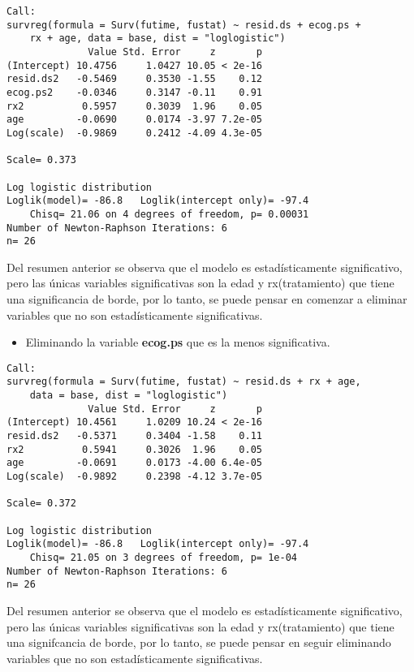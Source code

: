 \documentclass[
]{article}
\providecommand{\tightlist}{%
  \setlength{\itemsep}{0pt}\setlength{\parskip}{0pt}}
\begin{document}
\begin{verbatim}
Call:
survreg(formula = Surv(futime, fustat) ~ resid.ds + ecog.ps + 
    rx + age, data = base, dist = "loglogistic")
              Value Std. Error     z       p
(Intercept) 10.4756     1.0427 10.05 < 2e-16
resid.ds2   -0.5469     0.3530 -1.55    0.12
ecog.ps2    -0.0346     0.3147 -0.11    0.91
rx2          0.5957     0.3039  1.96    0.05
age         -0.0690     0.0174 -3.97 7.2e-05
Log(scale)  -0.9869     0.2412 -4.09 4.3e-05

Scale= 0.373 

Log logistic distribution
Loglik(model)= -86.8   Loglik(intercept only)= -97.4
    Chisq= 21.06 on 4 degrees of freedom, p= 0.00031 
Number of Newton-Raphson Iterations: 6 
n= 26 
\end{verbatim}

Del resumen anterior se observa que el modelo es estadísticamente
significativo, pero las únicas variables significativas son la edad y
rx(tratamiento) que tiene una significancia de borde, por lo tanto, se
puede pensar en comenzar a eliminar variables que no son
estadísticamente significativas.

\begin{itemize}
\tightlist
\item
  Eliminando la variable \textbf{ecog.ps} que es la menos significativa.
\end{itemize}

\begin{verbatim}
Call:
survreg(formula = Surv(futime, fustat) ~ resid.ds + rx + age, 
    data = base, dist = "loglogistic")
              Value Std. Error     z       p
(Intercept) 10.4561     1.0209 10.24 < 2e-16
resid.ds2   -0.5371     0.3404 -1.58    0.11
rx2          0.5941     0.3026  1.96    0.05
age         -0.0691     0.0173 -4.00 6.4e-05
Log(scale)  -0.9892     0.2398 -4.12 3.7e-05

Scale= 0.372 

Log logistic distribution
Loglik(model)= -86.8   Loglik(intercept only)= -97.4
    Chisq= 21.05 on 3 degrees of freedom, p= 1e-04 
Number of Newton-Raphson Iterations: 6 
n= 26 
\end{verbatim}

Del resumen anterior se observa que el modelo es estadísticamente
significativo, pero las únicas variables significativas son la edad y
rx(tratamiento) que tiene una signifcancia de borde, por lo tanto, se
puede pensar en seguir eliminando variables que no son estadísticamente
significativas.
\end{document}
